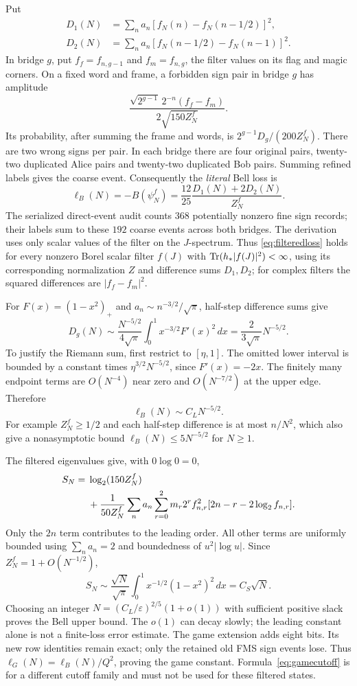 Put
\begin{align*}
 D_1(N)&=\sum_na_n[f_N(n)-f_N(n-1/2)]^2,\\
 D_2(N)&=\sum_na_n[f_N(n-1/2)-f_N(n-1)]^2.
\end{align*}
In bridge $g$, put $f_f=f_{n,g-1}$ and $f_m=f_{n,g}$, the filter values on its flag and magic corners. On a fixed word and frame, a forbidden sign pair in bridge $g$ has amplitude
\[
 \frac{\sqrt{2^{g-1}}\,2^{-n}(f_f-f_m)}{2\sqrt{150Z_N^f}}.
\]
Its probability, after summing the frame and words, is $2^{g-1}D_g/(200Z_N^f)$. There are two wrong signs per pair. In each bridge there are four original pairs, twenty-two duplicated Alice pairs and twenty-two duplicated Bob pairs. Summing refined labels gives the coarse event. Consequently the \emph{literal} Bell loss is
\begin{equation}\label{eq:filteredloss}
 \ell_B(N)=-B(\psi_N^f)=\frac{12}{25}\frac{D_1(N)+2D_2(N)}{Z_N^f}.
\end{equation}
The serialized direct-event audit counts $368$ potentially nonzero fine sign records; their labels sum to these $192$ coarse events across both bridges. The derivation uses only scalar values of the filter on the $J$-spectrum. Thus \eqref{eq:filteredloss} holds for every nonzero Borel scalar filter $f(J)$ with $\operatorname{Tr}(h_*|f(J)|^2)<\infty$, using its corresponding normalization $Z$ and difference sums $D_1,D_2$; for complex filters the squared differences are $|f_f-f_m|^2$.

For $F(x)=(1-x^2)_+$ and $a_n\sim n^{-3/2}/\sqrt\pi$, half-step difference sums give
\[
 D_g(N)\sim\frac{N^{-5/2}}{4\sqrt\pi}
        \int_0^1x^{-3/2}F'(x)^2\,dx
 =\frac{2}{3\sqrt\pi}N^{-5/2}.
\]
To justify the Riemann sum, first restrict to $[\eta,1]$. The omitted lower interval is bounded by a constant times $\eta^{3/2}N^{-5/2}$, since $F'(x)=-2x$. The finitely many endpoint terms are $O(N^{-4})$ near zero and $O(N^{-7/2})$ at the upper edge. Therefore
\[
 \ell_B(N)\sim C_LN^{-5/2}.
\]
For example $Z_N^f\geq1/2$ and each half-step difference is at most $n/N^2$, which also give a nonasymptotic bound $\ell_B(N)\leq5N^{-5/2}$ for $N\geq1$.

The filtered eigenvalues give, with $0\log0=0$,
\begin{align}\label{eq:filteredentropy}
 S_N={}&\log_2(150Z_N^f)\\
 &+\frac1{50Z_N^f}\sum_na_n\sum_{r=0}^2m_r2^rf_{n,r}^2
                   [2n-r-2\log_2f_{n,r}].\notag
\end{align}
Only the $2n$ term contributes to the leading order. All other terms are uniformly bounded using $\sum_na_n=2$ and boundedness of $u^2|\log u|$. Since $Z_N^f=1+O(N^{-1/2})$,
\[
 S_N\sim\frac{\sqrt N}{\sqrt\pi}
       \int_0^1x^{-1/2}(1-x^2)^2\,dx=C_S\sqrt N.
\]
Choosing an integer $N=(C_L/\varepsilon)^{2/5}(1+o(1))$ with sufficient positive slack proves the Bell upper bound. The $o(1)$ can decay slowly; the leading constant alone is not a finite-loss error estimate. The game extension adds eight bits. Its new row identities remain exact; only the retained old FMS sign events lose. Thus $\ell_G(N)=\ell_B(N)/Q^2$, proving the game constant. Formula~\eqref{eq:gamecutoff} is for a different cutoff family and must not be used for these filtered states.

